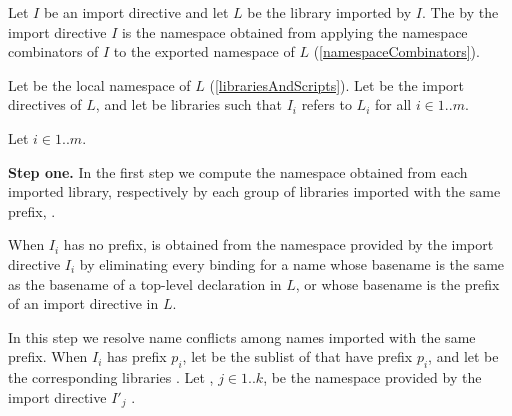 \documentclass[makeidx]{article}
\begin{document}
{

\LMHash{}%
Let $I$ be an import directive and let $L$ be the library imported by $I$.
The
by the import directive $I$ is the namespace obtained from applying
the namespace combinators of $I$
to the exported namespace of $L$
(\ref{namespaceCombinators}).


\LMHash{}%
Let  be the local namespace of $L$
(\ref{librariesAndScripts}).
Let  be the import directives of $L$,
and let  be libraries
such that $I_i$ refers to $L_i$ for all $i \in 1 .. m$.

\LMHash{}%
Let $i \in 1 .. m$.

\LMHash{}%
{\bf Step one.}
In the first step we compute the namespace obtained from each imported library,
respectively by each group of libraries imported with the same prefix,
.

\LMHash{}%
When $I_i$ has no prefix,  is obtained
from the namespace provided by the import directive $I_i$
by eliminating every binding for a name whose basename is
the same as the basename of a top-level declaration in $L$,
or whose basename is the prefix of an import directive in $L$.

\EndCase

\LMHash{}%
In this step we resolve name conflicts
among names imported with the same prefix.
When $I_i$ has prefix $p_i$,
let  be the sublist of  that have prefix $p_i$,
and let  be the corresponding libraries
.
Let , $j \in 1 .. k$,
be the namespace provided by the import directive $I'_j$
.

}
\end{document}
